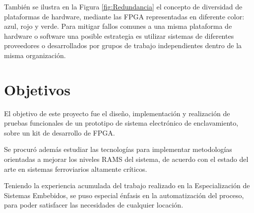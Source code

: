 			También se ilustra en la Figura \ref{fig:Redundancia} el concepto de diversidad de plataformas de hardware, mediante las FPGA representadas en diferente color: azul, rojo y verde. Para mitigar fallos comunes a una misma plataforma de hardware o software una posible estrategia es utilizar sistemas de diferentes proveedores o desarrollados por grupos de trabajo independientes dentro de la misma organización.

	\section{Objetivos}
	
		El objetivo de este proyecto fue el diseño, implementación y realización de pruebas funcionales de un prototipo de sistema electrónico de enclavamiento, sobre un kit de desarrollo de FPGA. 
		
		Se procuró además estudiar las tecnologías para implementar metodologías orientadas a mejorar los niveles RAMS del sistema, de acuerdo con el estado del arte en sistemas ferroviarios altamente críticos. 
		
		Teniendo la experiencia acumulada del trabajo realizado en la Especialización de Sistemas Embebidos, se puso especial énfasis en la automatización del proceso, para poder satisfacer las necesidades de cualquier locación. 

